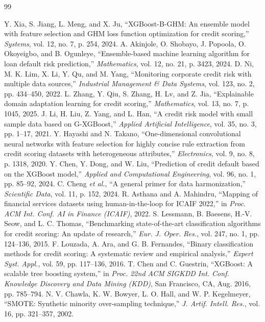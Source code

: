 \documentclass[onecolumn]{IEEEtai}
\begin{document}
\begin{thebibliography}{99}

 Y. Xia, S. Jiang, L. Meng, and X. Ju, ``XGBoost-B-GHM: An ensemble model with feature selection and GHM loss function optimization for credit scoring,'' {\em Systems}, vol. 12, no. 7, p. 254, 2024.
 A. Akinjole, O. Shobayo, J. Popoola, O. Okoyeigbo, and B. Ogunleye, ``Ensemble-based machine learning algorithm for loan default risk prediction,'' {\em Mathematics}, vol. 12, no. 21, p. 3423, 2024.
 D. Ni, M. K. Lim, X. Li, Y. Qu, and M. Yang, ``Monitoring corporate credit risk with multiple data sources,'' {\em Industrial Management \& Data Systems}, vol. 123, no. 2, pp. 434--450, 2022.
 L. Zhang, Y. Qiu, S. Zhang, H. Lv, and Z. Jia, ``Explainable domain adaptation learning for credit scoring,'' {\em Mathematics}, vol. 13, no. 7, p. 1045, 2025.
 J. Li, H. Liu, Z. Yang, and L. Han, ``A credit risk model with small sample data based on G-XGBoost,'' {\em Applied Artificial Intelligence}, vol. 35, no. 3, pp. 1--17, 2021.
 Y. Hayashi and N. Takano, ``One-dimensional convolutional neural networks with feature selection for highly concise rule extraction from credit scoring datasets with heterogeneous attributes,'' {\em Electronics}, vol. 9, no. 8, p. 1318, 2020.
 Y. Chen, Y. Dong, and W. Liu, ``Prediction of credit default based on the XGBoost model,'' {\em Applied and Computational Engineering}, vol. 96, no. 1, pp. 85--92, 2024.
 C. Cheng {\em et al.}, ``A general primer for data harmonization,'' {\em Scientific Data}, vol. 11, p. 152, 2024.
 R. Asthana and A. Mahindru, ``Mapping of financial services datasets using human-in-the-loop for ICAIF 2022,'' in {\em Proc. ACM Int. Conf. AI in Finance (ICAIF)}, 2022.
 S. Lessmann, B. Baesens, H.-V. Seow, and L. C. Thomas, ``Benchmarking state-of-the-art classification algorithms for credit scoring: An update of research,'' {\em Eur. J. Oper. Res.}, vol. 247, no. 1, pp. 124--136, 2015.
 F. Louzada, A. Ara, and G. B. Fernandes, ``Binary classification methods for credit scoring: A systematic review and empirical analysis,'' {\em Expert Syst. Appl.}, vol. 59, pp. 117--136, 2016.
 T. Chen and C. Guestrin, ``XGBoost: A scalable tree boosting system,'' in {\em Proc. 22nd ACM SIGKDD Int. Conf. Knowledge Discovery and Data Mining (KDD)}, San Francisco, CA, Aug. 2016, pp. 785--794.
 N. V. Chawla, K. W. Bowyer, L. O. Hall, and W. P. Kegelmeyer, ``SMOTE: Synthetic minority over-sampling technique,'' {\em J. Artif. Intell. Res.}, vol. 16, pp. 321--357, 2002.

\end{thebibliography}
\end{document}
